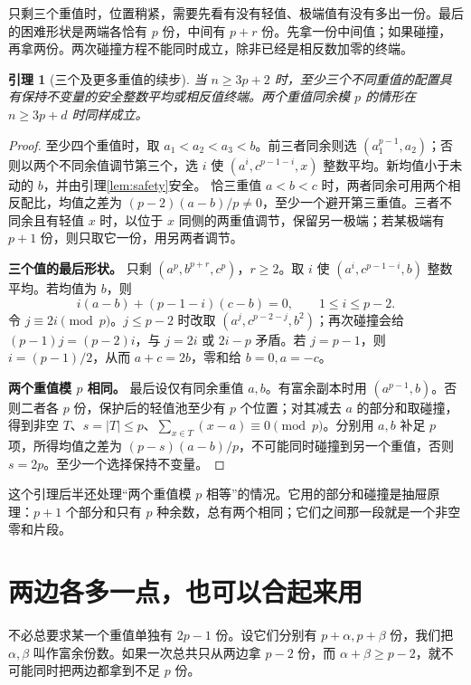 \documentclass[11pt,a4paper,oneside,openany]{book}
\newtheorem{lemma}[theorem]{引理}
\theoremstyle{definition}
\numberwithin{equation}{chapter}
\begin{document}
只剩三个重值时，位置稍紧，需要先看有没有轻值、极端值有没有多出一份。最后的困难形状是两端各恰有 $p$ 份，中间有 $p+r$ 份。先拿一份中间值；如果碰撞，再拿两份。两次碰撞方程不能同时成立，除非已经是相反数加零的终端。
\begin{lemma}[三个及更多重值的续步]\label{lem:heavy}
当 $n\ge3p+2$ 时，至少三个不同重值的配置具有保持不变量的安全整数平均或相反值终端。两个重值同余模 $p$ 的情形在 $n\ge3p+d$ 时同样成立。
\end{lemma}
\begin{proof}
至少四个重值时，取 $a_1<a_2<a_3<b$。前三者同余则选 $(a_1^{p-1},a_2)$；否则以两个不同余值调节第三个，选 $i$ 使 $(a^i,c^{p-1-i},x)$ 整数平均。新均值小于未动的 $b$，并由引理\ref{lem:safety}安全。
恰三重值 $a<b<c$ 时，两者同余可用两个相反配比，均值之差为 $(p-2)(a-b)/p\ne0$，至少一个避开第三重值。三者不同余且有轻值 $x$ 时，以位于 $x$ 同侧的两重值调节，保留另一极端；若某极端有 $p+1$ 份，则只取它一份，用另两者调节。
\par\noindent\textbf{三个值的最后形状。}
只剩 $(a^p,b^{p+r},c^p)$，$r\ge2$。取 $i$ 使 $(a^i,c^{p-1-i},b)$ 整数平均。若均值为 $b$，则
\[i(a-b)+(p-1-i)(c-b)=0,\qquad1\le i\le p-2.
\]
令 $j\equiv2i\pmod p$。$j\le p-2$ 时改取 $(a^j,c^{p-2-j},b^2)$；再次碰撞会给 $(p-1)j=(p-2)i$，与 $j=2i$ 或 $2i-p$ 矛盾。若 $j=p-1$，则 $i=(p-1)/2$，从而 $a+c=2b$，零和给 $b=0,a=-c$。
\par\noindent\textbf{两个重值模 $p$ 相同。}
最后设仅有同余重值 $a,b$。有富余副本时用 $(a^{p-1},b)$。否则二者各 $p$ 份，保护后的轻值池至少有 $p$ 个位置；对其减去 $a$ 的部分和取碰撞，得到非空 $T$、$s=|T|\le p$、$\sum_{x\in T}(x-a)\equiv0\pmod p$。分别用 $a,b$ 补足 $p$ 项，所得均值之差为 $(p-s)(a-b)/p$，不可能同时碰撞到另一个重值，否则 $s=2p$。至少一个选择保持不变量。
\end{proof}
这个引理后半还处理“两个重值模 $p$ 相等”的情况。它用的部分和碰撞是抽屉原理：$p+1$ 个部分和只有 $p$ 种余数，总有两个相同；它们之间那一段就是一个非空零和片段。

\section{两边各多一点，也可以合起来用}
不必总要求某一个重值单独有 $2p-1$ 份。设它们分别有 $p+\alpha,p+\beta$ 份，我们把 $\alpha,\beta$ 叫作富余份数。如果一次总共只从两边拿 $p-2$ 份，而 $\alpha+\beta\ge p-2$，就不可能同时把两边都拿到不足 $p$ 份。
\end{document}
